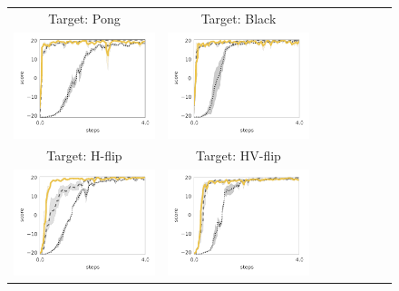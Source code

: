 \begin{figure}
     \begin{tabular}{cccccccc}
	Target: Pong & Target: Black \\
        \includegraphics[width=.44\textwidth]{figures/app_plots/pongs/pong/pong} &
        \includegraphics[width=.44\textwidth]{figures/app_plots/pongs/pong/pong_black} \\

	Target: H-flip & Target: HV-flip \\
        \includegraphics[width=.44\textwidth]{figures/app_plots/pongs/pong/pong_h_flip} &
        \includegraphics[width=.44\textwidth]{figures/app_plots/pongs/pong/pong_hv_flip} \\


\end{tabular}
\end{figure}
